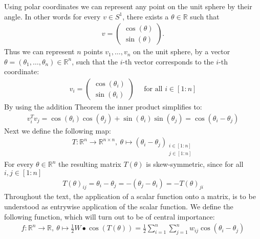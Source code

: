 \documentclass[12pt,a4paper]{article}
\theoremstyle{mythm}
\begin{document}
Using polar coordinates we can represent any point on the unit sphere by their angle.
In other words for every $ v \in S^1 $, there exists a $ \theta \in \mathbb{R}  $ such that 
\begin{align*}
v = 
\begin{pmatrix}
\cos( \theta ) \\
\sin( \theta ) 
\end{pmatrix}.
\end{align*}
Thus we can represent $ n $ points $ v_1, \dots, v_n $ on the unit sphere, by a vector 
$ \theta = \left( \theta _{ 1 } , \dots, \theta _{ n }  \right) \in \mathbb{R} ^{ n }  $, such that 
the $ i $-th vector corresponds to the $ i $-th coordinate:
\begin{align}
\label{eq:polar} 
v_i = 
\begin{pmatrix}
\cos( \theta  _{ i } ) \\
\sin( \theta _{ i } ) 
\end{pmatrix} 
\quad \text{ for all } i \in \left[ 1:n \right] 
\end{align} 
By using the addition Theorem the inner product simplifies to:
\begin{align}
\label{eq:sp2cos} 
v_i ^{ T } v_j = \cos( \theta _{ i }  ) \cos( \theta _{ j }  ) + \sin( \theta _{ i }  ) \sin( \theta _{ j }  ) = \cos( \theta _{ i } - \theta _{ j }  ) 
\end{align} 
Next we define the following map: 
\begin{align*}
T  : \mathbb{R} ^{ n }  \to \mathbb{R} ^{ n \times n }  , \ \theta  \mapsto \left(  \theta _{ i } - \theta _{ j } \right)
_{ \substack{i \in \left[  1:n\right] \\ j \in \left[  1:n\right] } } 
\end{align*} 
For every $ \theta \in \mathbb{R} ^{ n }  $ the resulting matrix $ T \left( \theta \right)  $ is skew-symmetric, since for all $ i,j \in \left[ 1:n \right]  $
\begin{align*}
T (\theta) _{ ij } = \theta _{ i } - \theta _{ j } = - \left( \theta _{ j } - \theta _{ i }  \right) = - T (\theta) _{ ji } 
\end{align*} 
Throughout the text, the application of a scalar function onto a matrix, is to be understood as entrywise application of the scalar function.
We define the following function, which will turn out to be of central importance:
\begin{align*}
f : \mathbb{R} ^{ n }  \to \mathbb{R}  , \ \theta \mapsto \frac{ 1 }{ 2 } W \bullet \cos( T(\theta) ) = \frac{ 1 }{ 2 } \sum_{ i = 1 }^{ n } \sum_{ j = 1 }^{ n } w _{ ij }
\cos( \theta _{ i } - \theta _{ j }  ) 
\end{align*} 
\end{document}
